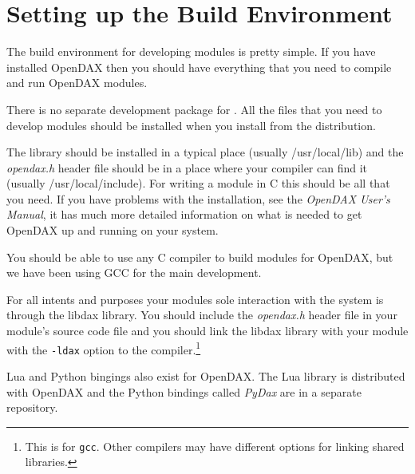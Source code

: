 

\section{Setting up the Build Environment}
The build environment for developing modules is pretty simple.  If you have installed OpenDAX then you should have everything that you need to compile and run OpenDAX modules.

There is no separate development package for \opendax.  All the files that you need to develop modules should be installed when you install \opendax from the distribution.

The library should be installed in a typical place (usually /usr/local/lib) and the \textit{opendax.h} header file should be in a place where your compiler can find it (usually /usr/local/include).  For writing a module in C this should be all that you need.  If you have problems with the installation, see the \emph{OpenDAX User's Manual}, it has much more detailed information on what is needed to get OpenDAX up and running on your system.

You should be able to use any C compiler to build modules for OpenDAX, but we have been using GCC for the main development.

For all intents and purposes your modules sole interaction with the \opendax system is through the libdax library.  You should include the \emph{opendax.h} header file in your module's source code file and you should link the libdax library with your module with the \verb|-ldax| option to the compiler.\footnote{This is for \texttt{gcc}. Other compilers may have different options for linking shared libraries.}

Lua and Python bingings also exist for OpenDAX.  The Lua library is distributed with OpenDAX and the Python bindings called \textit{PyDax} are in a separate repository.
